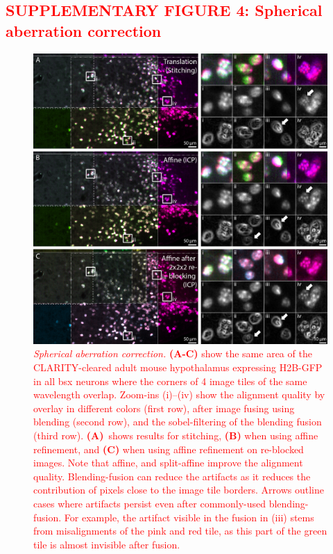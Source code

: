 \documentclass[]{spie}  %
\def\red{\textcolor{red}}
\begin{document}
\subsection*{\red{SUPPLEMENTARY FIGURE 4: Spherical aberration correction}}
\vspace{1mm}
\begin{figure}[h!]
\includegraphics[width=\textwidth]{fig-sph_aberrations.jpg}
\vspace{-2.0mm}
\caption{\hspace{-0.5mm} \red{\emph{Spherical aberration correction.} \textbf{(A-C)} show the same area of the CLARITY-cleared adult mouse hypothalamus expressing H2B-GFP in all bsx neurons where the corners of 4 image tiles of the same wavelength overlap. Zoom-ins (i)--(iv) show the alignment quality by overlay in different colors (first row), after image fusing using blending (second row), and the sobel-filtering of the blending fusion (third row). \textbf{(A)}~shows results for stitching, \textbf{(B)} when using affine refinement, and \textbf{(C)} when using affine refinement on re-blocked images. Note that affine, and split-affine improve the alignment quality. Blending-fusion can reduce the artifacts as it reduces the contribution of pixels close to the image tile borders. Arrows outline cases where artifacts persist even after commonly-used blending-fusion. For example, the artifact visible in the fusion in (iii) stems from misalignments of the pink and red tile, as this part of the green tile is almost invisible after fusion.
}}
\label{fig:sup-spherical}
\end{figure}
\end{document}
